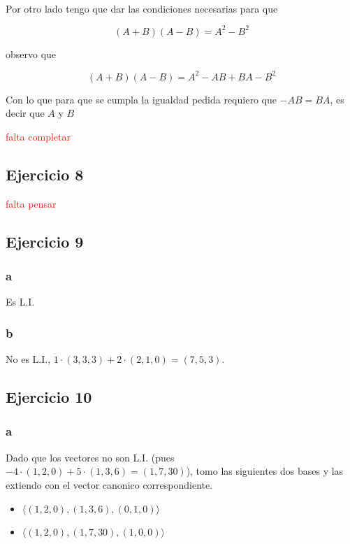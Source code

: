 \documentclass{article}
\begin{document}

\

\noindent Por otro lado tengo que dar las condiciones necesarias para que 

\[(A+B)(A-B) = A^2 - B^2\]

observo que 

\[(A+B)(A-B) = A^2 - AB + BA - B^2\]

\noindent Con lo que para que se cumpla la igualdad pedida requiero que $-AB = BA$, es decir que $A$ y $B$

\textcolor{red}{falta completar}



\subsection*{Ejercicio 8}

\textcolor{red}{falta pensar}

\subsection*{Ejercicio 9}

\subsubsection*{a}

Es L.I.

\subsubsection*{b}

No es L.I., $1\cdot(3,3,3) + 2\cdot(2,1,0) = (7,5,3)$.

\subsection*{Ejercicio 10}

\subsubsection*{a}

Dado que los vectores no son L.I. (pues $-4\cdot(1,2,0)+ 5\cdot(1,3,6) = (1,7,30)$), 
tomo las siguientes dos bases y las extiendo con el vector canonico correspondiente.
\begin{itemize}
    \item $\langle (1,2,0), (1,3,6), (0,1,0) \rangle$
    \item $\langle (1,2,0), (1,7,30), (1,0,0) \rangle$
\end{itemize}
\end{document}
